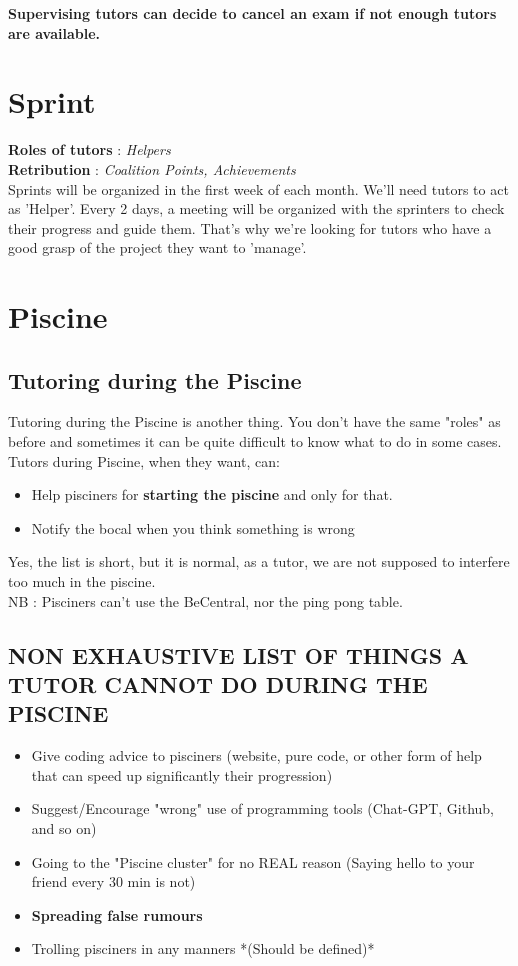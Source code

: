 \documentclass{article}
\begin{document}
\textbf{Supervising tutors can decide to cancel an exam if not enough tutors are available.}

\section{Sprint}
\textbf{Roles of tutors} : \textit{Helpers} \\
\textbf{Retribution} : \textit{Coalition Points, Achievements} \\ 
Sprints will be organized in the first week of each month. We'll need tutors to act as 'Helper'. Every 2 days, a meeting will be organized with the sprinters to check their progress and guide them.
That's why we're looking for tutors who have a good grasp of the project they want to 'manage'.

\clearpage

\section{Piscine}

\subsection{Tutoring during the Piscine}
Tutoring during the Piscine is another thing.
You don't have the same "roles" as before and sometimes it can be quite difficult to know what to do in some cases. \\
Tutors during Piscine, when they want, can:
\begin{itemize}
    \item Help pisciners for \textbf{starting the piscine} and only for that.
    \item Notify the bocal when you think something is wrong
\end{itemize}
Yes, the list is short, but it is normal, as a tutor, we are not supposed to interfere too much in the piscine. \\ 
NB : Pisciners can't use the BeCentral, nor the ping pong table.

\subsection{NON EXHAUSTIVE LIST OF THINGS A TUTOR CANNOT DO DURING THE PISCINE}
\begin{itemize}
    \item Give coding advice to pisciners (website, pure code, or other form of help that can speed up significantly their progression)
    \item Suggest/Encourage "wrong" use of programming tools (Chat-GPT, Github, and so on)
    \item Going to the "Piscine cluster" for no REAL reason (Saying hello to your friend every 30 min is not)
    \item \textbf{Spreading false rumours}
    \item Trolling pisciners in any manners *(Should be defined)*
\end{itemize}
\end{document}
